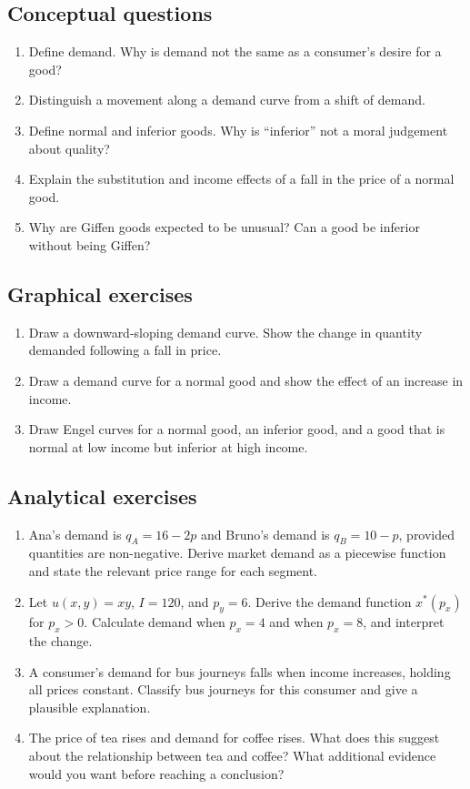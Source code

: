 \subsection*{Conceptual questions}
\begin{enumerate}[label=\arabic*.]
  \item Define demand. Why is demand not the same as a consumer's desire for a good?
  \item Distinguish a movement along a demand curve from a shift of demand.
  \item Define normal and inferior goods. Why is ``inferior'' not a moral judgement about quality?
  \item Explain the substitution and income effects of a fall in the price of a normal good.
  \item Why are Giffen goods expected to be unusual? Can a good be inferior without being Giffen?
\end{enumerate}

\subsection*{Graphical exercises}
\begin{enumerate}[resume,label=\arabic*.]
  \item Draw a downward-sloping demand curve. Show the change in quantity demanded following a fall in price.
  \item Draw a demand curve for a normal good and show the effect of an increase in income.
  \item Draw Engel curves for a normal good, an inferior good, and a good that is normal at low income but inferior at high income.
\end{enumerate}

\subsection*{Analytical exercises}
\begin{enumerate}[resume,label=\arabic*.]
  \item Ana's demand is $q_A=16-2p$ and Bruno's demand is $q_B=10-p$, provided quantities are non-negative. Derive market demand as a piecewise function and state the relevant price range for each segment.
  \item Let $u(x,y)=xy$, $I=120$, and $p_y=6$. Derive the demand function $x^*(p_x)$ for $p_x>0$. Calculate demand when $p_x=4$ and when $p_x=8$, and interpret the change.
  \item A consumer's demand for bus journeys falls when income increases, holding all prices constant. Classify bus journeys for this consumer and give a plausible explanation.
  \item The price of tea rises and demand for coffee rises. What does this suggest about the relationship between tea and coffee? What additional evidence would you want before reaching a conclusion?
\end{enumerate}

